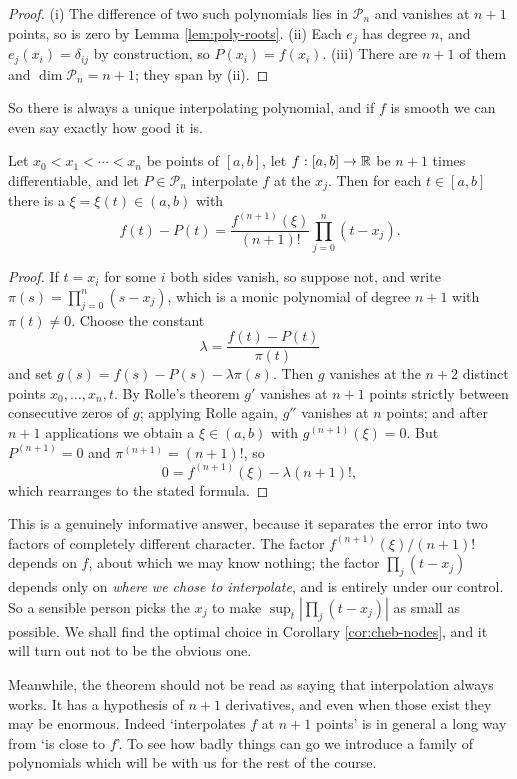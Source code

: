 \documentclass[a4paper]{scrartcl}
\newcommand{\Pn}{\mathcal{P}}
\begin{document}
\begin{proof}
	(i) The difference of two such polynomials lies in $\Pn_n$ and vanishes at $n+1$ points, so is zero by Lemma \ref{lem:poly-roots}. (ii) Each $e_j$ has degree $n$, and $e_j(x_i)=\delta_{ij}$ by construction, so $P(x_i) = f(x_i)$. (iii) There are $n+1$ of them and $\dim \Pn_n = n+1$; they span by (ii).
\end{proof}

So there is always a unique interpolating polynomial, and if $f$ is smooth we can even say exactly how good it is.

\begin{theorem}\label{thm:interp-error}
	Let $x_0<x_1<\cdots<x_n$ be points of $[a,b]$, let $f : [a,b]\to\mathbb{R}$ be $n+1$ times differentiable, and let $P \in\Pn_n$ interpolate $f$ at the $x_j$. Then for each $t \in[a,b]$ there is a $\xi = \xi(t) \in (a,b)$ with
	$$f(t)-P(t) = \frac{f^{(n+1)}(\xi)}{(n+1)!}\prod_{j=0}^n(t-x_j).$$
\end{theorem}

\begin{proof}
	If $t = x_i$ for some $i$ both sides vanish, so suppose not, and write $\pi(s) = \prod_{j=0}^n(s-x_j)$, which is a monic polynomial of degree $n+1$ with $\pi(t)\neq0$. Choose the constant
	$$\lambda = \frac{f(t)-P(t)}{\pi(t)}$$
	and set $g(s) = f(s)-P(s)-\lambda\pi(s)$. Then $g$ vanishes at the $n+2$ distinct points $x_0,\ldots,x_n,t$. By Rolle's theorem $g'$ vanishes at $n+1$ points strictly between consecutive zeros of $g$; applying Rolle again, $g''$ vanishes at $n$ points; and after $n+1$ applications we obtain a $\xi\in(a,b)$ with $g^{(n+1)}(\xi)=0$. But $P^{(n+1)} = 0$ and $\pi^{(n+1)} = (n+1)!$, so
	$$0 = f^{(n+1)}(\xi)-\lambda(n+1)!,$$
	which rearranges to the stated formula.
\end{proof}

This is a genuinely informative answer, because it separates the error into two factors of completely different character. The factor $f^{(n+1)}(\xi)/(n+1)!$ depends on $f$, about which we may know nothing; the factor $\prod_j(t-x_j)$ depends only on \emph{where we chose to interpolate}, and is entirely under our control. So a sensible person picks the $x_j$ to make $\sup_t\left|\prod_j(t-x_j)\right|$ as small as possible. We shall find the optimal choice in Corollary \ref{cor:cheb-nodes}, and it will turn out not to be the obvious one.

Meanwhile, the theorem should not be read as saying that interpolation always works. It has a hypothesis of $n+1$ derivatives, and even when those exist they may be enormous. Indeed `interpolates $f$ at $n+1$ points' is in general a long way from `is close to $f$'. To see how badly things can go we introduce a family of polynomials which will be with us for the rest of the course.
\end{document}
